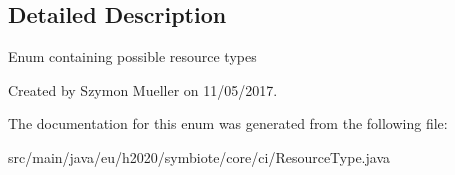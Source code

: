 \subsection{Detailed Description}
Enum containing possible resource types

Created by Szymon Mueller on 11/05/2017. 

The documentation for this enum was generated from the following file\+:\begin{DoxyCompactItemize}
\item 
src/main/java/eu/h2020/symbiote/core/ci/Resource\+Type.\+java\end{DoxyCompactItemize}
